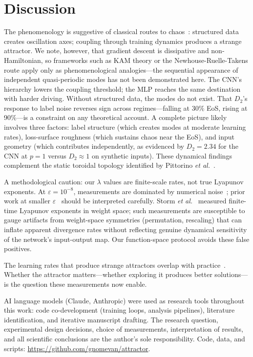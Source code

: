 \documentclass[aps,prl,twocolumn,superscriptaddress,floatfix]{revtex4-2}
\begin{document}
\section{Discussion}

The phenomenology is suggestive of classical routes to chaos~\cite{ruelle1971,newhouse1978}: structured data creates oscillation axes; coupling through training dynamics produces a strange attractor. We note, however, that gradient descent is dissipative and non-Hamiltonian, so frameworks such as KAM theory or the Newhouse-Ruelle-Takens route apply only as phenomenological analogies---the sequential appearance of independent quasi-periodic modes has not been demonstrated here. The CNN's hierarchy lowers the coupling threshold; the MLP reaches the same destination with harder driving. Without structured data, the modes do not exist. That $D_2$'s response to label noise reverses sign across regimes---falling at 30\% EoS, rising at 90\%---is a constraint on any theoretical account. A complete picture likely involves three factors: label structure (which creates modes at moderate learning rates), loss-surface roughness (which sustains chaos near the EoS), and input geometry (which contributes independently, as evidenced by $D_2 = 2.34$ for the CNN at $p = 1$ versus $D_2 \approx 1$ on synthetic inputs). These dynamical findings complement the static toroidal topology identified by Pittorino \textit{et al.}~\cite{pittorino2022}.

A methodological caution: our $\lambda$ values are finite-scale rates, not true Lyapunov exponents. At $\varepsilon = 10^{-8}$, measurements are dominated by numerical noise~\cite{sm}; prior work at smaller $\varepsilon$~\cite{morales2024} should be interpreted carefully. Storm \textit{et al.}~\cite{storm2024} measured finite-time Lyapunov exponents in weight space; such measurements are susceptible to gauge artifacts from weight-space symmetries (permutation, rescaling) that can inflate apparent divergence rates without reflecting genuine dynamical sensitivity of the network's input-output map. Our function-space protocol avoids these false positives.

The learning rates that produce strange attractors overlap with practice~\cite{cohen2021}. Whether the attractor matters---whether exploring it produces better solutions---is the question these measurements now enable.

\begin{acknowledgments}
AI language models (Claude, Anthropic) were used as research tools throughout this work: code co-development (training loops, analysis pipelines), literature identification, and iterative manuscript drafting. The research question, experimental design decisions, choice of measurements, interpretation of results, and all scientific conclusions are the author's sole responsibility. Code, data, and scripts: \url{https://github.com/gnomevan/attractor}.
\end{acknowledgments}


\end{document}
